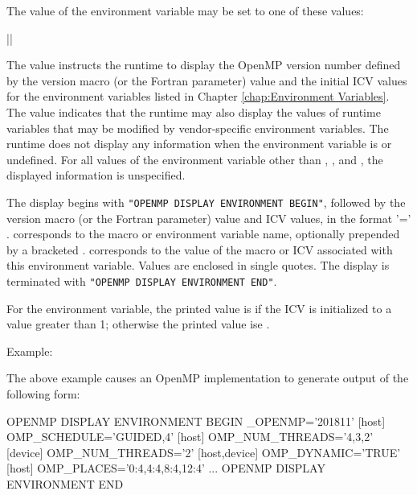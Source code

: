 The value of the  environment variable may be set 
to one of these values:

{||}

The  value instructs the runtime to display the OpenMP version 
number defined by the  version macro (or the  
Fortran parameter) value and the initial ICV values for the environment variables 
listed in Chapter \ref{chap:Environment Variables}. The 
value indicates that the runtime may also display the values
of runtime variables that may be modified by vendor-specific
environment variables. The runtime does not display any information
when the  environment variable is
 or undefined. For all values of the environment
variable other than , , and ,
the displayed information is unspecified.

The display begins with \texttt{"OPENMP DISPLAY ENVIRONMENT BEGIN"}, 
followed by the  version macro (or the  
Fortran parameter) value and ICV values, in the format  '=' 
.  corresponds to the macro or environment variable 
name, optionally prepended by a bracketed . 
corresponds to the value of the macro or ICV associated with this environment 
variable. Values are enclosed in single quotes. The display is 
terminated with \texttt{"OPENMP DISPLAY ENVIRONMENT END"}.

For the  environment variable, the printed value is
 if the  ICV is initialized to a
value greater than 1; otherwise the printed value ise .

Example:
\begin{ompEnv}
\end{ompEnv}

The above example causes an OpenMP implementation to generate output of the
following form:

\begin{ompEnv}
OPENMP DISPLAY ENVIRONMENT BEGIN
  _OPENMP='201811'
  [host] OMP_SCHEDULE='GUIDED,4'
  [host] OMP_NUM_THREADS='4,3,2'
  [device] OMP_NUM_THREADS='2'
  [host,device] OMP_DYNAMIC='TRUE'
  [host] OMP_PLACES='{0:4},{4:4},{8:4},{12:4}'
  ...
OPENMP DISPLAY ENVIRONMENT END
\end{ompEnv}


